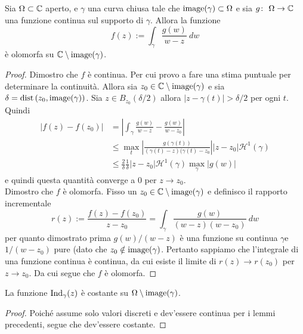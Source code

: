 \begin{lemma}
  Sia $\Omega \subset \mathbb{C}$ aperto, e $\gamma$ una curva chiusa tale che
  $\operatorname{image}(\gamma) \subset \Omega$ e sia $g \colon\ \Omega \rightarrow \mathbb{C}$ una
  funzione continua sul supporto di $\gamma$. Allora la funzione
  \begin{equation*}
    f(z) := \int_\gamma \frac{g(w)}{w-z}\ dw
  \end{equation*}
  è olomorfa su $\mathbb{C} \setminus \operatorname{image}(\gamma)$. 
  \label{lem:index-function-holomorphic}
\end{lemma}
\begin{proof}
  Dimostro che $f$ è continua. Per cui provo a fare una stima puntuale per
  determinare la continuità. Allora sia $z_0 \in \mathbb{C} \setminus
  \operatorname{image}(\gamma)$ e sia $\delta = \operatorname{dist}\left(z_0, \operatorname{image}(\gamma)\right)$. 
  Sia $z \in B_{z_0} (\delta/2)$ allora $|z-\gamma(t)| > \delta/2$ per ogni
  $t$. Quindi
  \begin{align*}
    |f(z) - f(z_0)| & = \left|\int_\gamma \frac{g(w)}{w-z} - 
                         \frac{g(w)}{w - z_0} \right| \\
                         & \le \max_{t}
                         \left|\frac{g(\gamma(t))}{(\gamma(t)-z)(\gamma(t)
                           - z_0}\right| |z-z_0| \mathcal{H}^1(\gamma) \\
                           & \le \frac{2}{\delta}\frac{1}{\delta} |z-z_0|
                           \mathcal{H}^1(\gamma) \max_{\gamma} |g(w)|
  \end{align*}
  e quindi questa quantità converge a $0$ per $z\to z_0$.\\

  Dimostro che $f$ è olomorfa. Fisso un $z_0 \in \mathbb{C} \setminus \operatorname{image}(\gamma)$
  e definisco il rapporto incrementale  
  \begin{equation*}
    r(z) := \frac{f(z) - f(z_0)}{z-z_0} = \int_\gamma
    \frac{g(w)}{(w-z)(w-z_0)}\ dw 
  \end{equation*}
  per quanto dimostrato prima $g(w)/(w-z)$ è una funzione su continua
  $\gamma$e $1/(w - z_0)$ pure (dato che $z_0 \notin \operatorname{image}(\gamma)$.
  Pertanto sappiamo che l'integrale di una funzione continua è continua,
  da cui esiste il limite di $r(z) \to r(z_0)$ per $z \to z_0$. Da cui segue
  che $f$ è olomorfa.
\end{proof}

\begin{corollary}
  La funzione $\operatorname{Ind}_\gamma(z)$ è costante su $\Omega
  \setminus \operatorname{image}(\gamma)$.
  \label{cor:ind-is-constant-over-connex-spaces}
\end{corollary}
\begin{proof}
  Poiché assume solo valori discreti e dev'essere continua per i lemmi
  precedenti, segue che dev'essere costante.
\end{proof}

